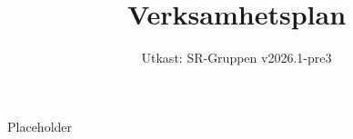 \documentclass[a4paper]{dtek}
\title{Verksamhetsplan}
\date{Utkast: SR-Gruppen v2026.1-pre3}
\begin{document}
Placeholder
\end{document}
